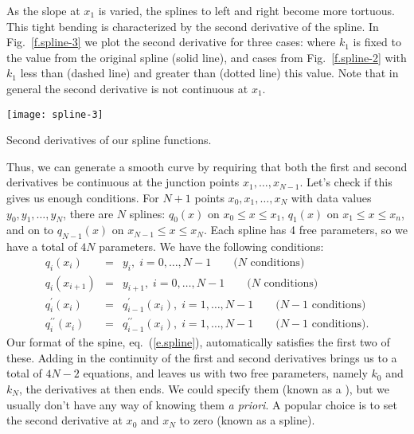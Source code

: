 As the slope at $x_{1}$ is varied, the splines to left and right become more tortuous. This tight bending is characterized by the second derivative of the spline. In Fig.~\ref{f.spline-3} we plot the second derivative for three cases: where $k_{1}$ is fixed to the value from the original spline (solid line), and cases from Fig.~\ref{f.spline-2} with $k_{1}$ less than (dashed line) and greater than (dotted line) this value. Note that in general the second derivative is not continuous at $x_{1}$. 

\begin{marginfigure}
\texttt{[image: spline-3]}
\caption{\label{f.spline-3} Second derivatives of our spline functions.}
\end{marginfigure}

Thus, we can generate a smooth curve by requiring that both the first and second derivatives be continuous at the junction points $x_{1},\ldots,x_{N-1}$. Let's check if this gives us enough conditions. For $N+1$ points $x_{0},x_{1},\ldots,x_{N}$ with data values $y_{0},y_{1},\ldots,y_{N}$, there are $N$ splines: $q_{0}(x)$ on $x_{0}\le x\le x_{1}$, $q_{1}(x)$ on $x_{1}\le x \le x_{n}$, and on to $q_{N-1}(x)$ on $x_{N-1}\le x\le x_{N}$. Each spline has 4 free parameters, so we have a total of $4N$ parameters. We have the following conditions:
\begin{eqnarray*}
q_{i}(x_{i}) &=& y_{i},\;i=0,\ldots,N-1\qquad\textrm{($N$ conditions)}\\
q_{i}(x_{i+1}) &=& y_{i+1},\;i=0,\ldots,N-1\qquad\textrm{($N$ conditions)}\\
q^{\prime}_{i}(x_{i}) &=& q^{\prime}_{i-1}(x_{i}),\;i=1,\ldots,N-1\qquad\textrm{($N-1$ conditions)}\\
q^{\prime\prime}_{i}(x_{i}) &=& q^{\prime\prime}_{i-1}(x_{i}),\;i=1,\ldots,N-1\qquad\textrm{($N-1$ conditions)}.
\end{eqnarray*}
Our format of the spine, eq.~(\ref{e.spline}), automatically satisfies the first two of these. Adding in the continuity of the first and second derivatives brings us to a total of $4N-2$ equations, and leaves us with two free parameters, namely $k_{0}$ and $k_{N}$, the derivatives at then ends. We could specify them (known as a ), but we usually don't have any way of knowing them \emph{a priori}. A popular choice is to set the second derivative at $x_{0}$ and $x_{N}$ to zero (known as a  spline).

